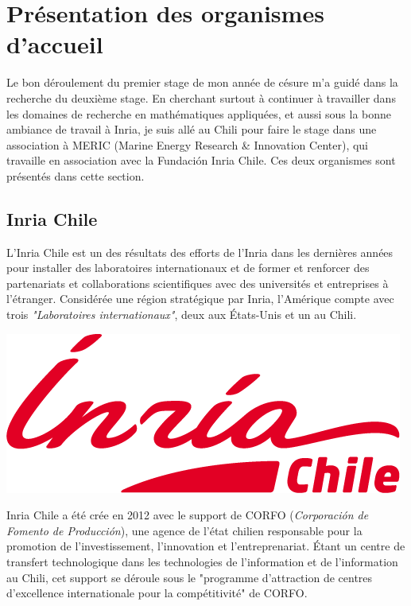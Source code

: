 \section{Présentation des organismes d'accueil}

\indent Le bon déroulement du premier stage de mon année de césure m'a guidé dans la recherche du deuxième stage. En cherchant surtout à continuer à travailler dans les domaines de recherche en mathématiques appliquées, et aussi sous la bonne ambiance de travail à Inria, je suis allé au Chili pour faire le stage dans une association à MERIC (Marine Energy Research \& Innovation Center), qui travaille en association avec la Fundación Inria Chile. Ces deux organismes sont présentés dans cette section.

\subsection{Inria Chile}

\indent L'Inria Chile est un des résultats des efforts de l'Inria dans les dernières années pour installer des laboratoires internationaux et de former et renforcer des partenariats et collaborations scientifiques avec des universités et entreprises à l'étranger. Considérée une région stratégique par Inria, l'Amérique compte avec trois \emph{"Laboratoires internationaux"}, deux aux États-Unis et un au Chili.

\indent
\begingroup
\centering
\includegraphics[scale=.3]{figures/logos/Inria-Chile.png}
\endgroup

\indent Inria Chile a été crée en 2012 avec le support de CORFO (\emph{Corporación de Fomento de Producción}), une agence de l'état chilien responsable pour la promotion de l'investissement, l'innovation et l'entreprenariat. Étant un centre de transfert technologique dans les technologies de l'information et de  l'information au Chili, cet support se déroule sous le "programme d'attraction de centres d'excellence internationale pour la compétitivité" de CORFO.

